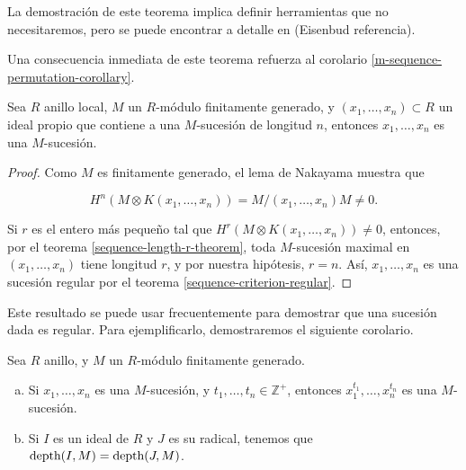 La demostración de este teorema implica definir herramientas que no necesitaremos, pero se puede encontrar a detalle en (Eisenbud referencia).

Una consecuencia inmediata de este teorema refuerza al corolario \ref{m-sequence-permutation-corollary}.

\begin{corollary}\label{m-sequence-from-another-criteria}
Sea $R$ anillo local, $M$ un $R$-módulo finitamente generado, y $(x_1,\dots,x_n) \subset R$ un ideal propio que contiene a una $M$-sucesión de longitud $n$, entonces $x_1,\dots,x_n$ es una $M$-sucesión.
\end{corollary}

\begin{proof}
Como $M$ es finitamente generado, el lema de Nakayama muestra que 

$$H^n(M \otimes K(x_1,\dots,x_n)) = M/(x_1,\dots,x_n)M \neq 0.$$

Si $r$ es el entero más pequeño tal que $H^r(M\otimes K(x_1,\dots,x_n)) \neq 0$, entonces, por el teorema \ref{sequence-length-r-theorem}, toda $M$-sucesión maximal en $(x_1,\dots,x_n)$ tiene longitud $r$, y por nuestra hipótesis, $r = n$. Así, $x_1,\dots,x_n$ es una sucesión regular por el teorema \ref{sequence-criterion-regular}.
\end{proof}

Este resultado se puede usar frecuentemente para demostrar que una sucesión dada es regular. Para ejemplificarlo, demostraremos el siguiente corolario.

\begin{corollary}
Sea $R$ anillo, y $M$ un $R$-módulo finitamente generado.
\begin{enumerate}[a.]
\item Si $x_1,\dots,x_n$ es una $M$-sucesión, y $t_1,\dots,t_n \in \mathbb{Z}^+$, entonces $x_1^{t_1},\dots,x_n^{t_n}$ es una $M$-sucesión.
\item Si $I$ es un ideal de $R$ y $J$ es su radical, tenemos que $\textrm{depth}(I,M) = \textrm{depth}(J, M)$.
\end{enumerate}
\end{corollary}

